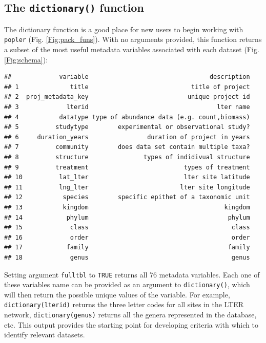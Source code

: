 \documentclass{article}\usepackage[]{graphicx}\usepackage[]{color}
\makeatletter
\newenvironment{kframe}{%
 \def\at@end@of@kframe{}%
 \ifinner\ifhmode%
  \def\at@end@of@kframe{\end{minipage}}%
  \begin{minipage}{\columnwidth}%
 \fi\fi%
 \def\FrameCommand##1{\hskip\@totalleftmargin \hskip-\fboxsep
 \colorbox{shadecolor}{##1}\hskip-\fboxsep
     \hskip-\linewidth \hskip-\@totalleftmargin \hskip\columnwidth}%
 \MakeFramed {\advance\hsize-\width
   \@totalleftmargin\z@ \linewidth\hsize
   \@setminipage}}%
 {\par\unskip\endMakeFramed%
 \at@end@of@kframe}
\newenvironment{knitrout}{}{} %
\newcommand{\tom}[1]{{\textit{\color{red}{[#1]}}}}
\makeatother
\begin{document}
\subsection*{The \texttt{dictionary()} function}
The dictionary function is a good place for new users to begin working with \texttt{popler} (Fig. \ref{Fig:pack_funs}). With no arguments provided, this function returns a subset of the most useful metadata variables associated with each  dataset (Fig. \ref{Fig:schema}):
\begin{knitrout}
\color{fgcolor}\begin{kframe}
\begin{verbatim}
##             variable                                 description
## 1              title                            title of project
## 2  proj_metadata_key                           unique project id
## 3             lterid                                   lter name
## 4           datatype type of abundance data (e.g. count,biomass)
## 5          studytype        experimental or observational study?
## 6     duration_years                duration of project in years
## 7          community        does data set contain multiple taxa?
## 8          structure               types of indidivual structure
## 9          treatment                          types of treatment
## 10          lat_lter                          lter site latitude
## 11          lng_lter                         lter site longitude
## 12           species        specific epithet of a taxonomic unit
## 13           kingdom                                     kingdom
## 14            phylum                                      phylum
## 15             class                                       class
## 16             order                                       order
## 17            family                                      family
## 18             genus                                       genus
\end{verbatim}
\end{kframe}
\end{knitrout}
Setting argument \texttt{full\textunderscore tbl} to \texttt{TRUE} returns all 76 metadata variables. Each one of these variables name can be provided as an argument to \texttt{dictionary()}, which will then return the possible unique values of the variable. For example, \texttt{dictionary(lterid)} returns the three letter codes for all sites in the LTER network, \texttt{dictionary(genus)} returns all the genera represented in the database, etc. This output provides the starting point for developing criteria with which to identify relevant datasets.
\tom{Note for Aldo: I thought we decided that dictionary(variable) would return the unique levels of factors and quantiles of continuous variables. This is not how it is working. dictionary(duration\textunderscore years) returns unique levels of years. Also, the output shows studies less than 5 years, including zero years and one NA. This is not consistent with the criteria stated in the text. This will need some attention. Lastly, we should probably cut `Chromalveolata' from the kingdom data.}
\end{document}

